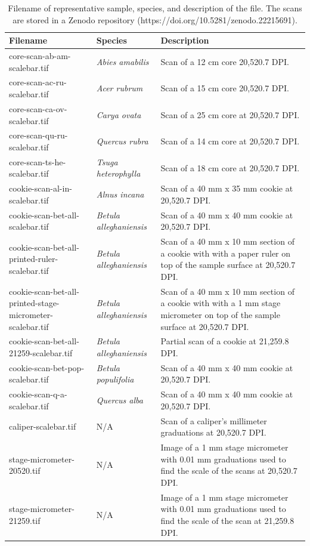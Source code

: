 \begin{table}[htbp]
    \centering
    \begin{tabular}{ |p{4.0cm}||p{4.0cm}|p{6.0cm}| }
        \hline
        \hline
        Filename & Species & Description \\
        \hline
        core-scan-ab-am-scalebar.tif & \textit{Abies amabilis} & Scan of a 12 cm core 20,520.7 DPI. \\
        core-scan-ac-ru-scalebar.tif & \textit{Acer rubrum} & Scan of a 15 cm core 20,520.7 DPI. \\
        core-scan-ca-ov-scalebar.tif & \textit{Carya ovata} & Scan of a 25 cm core at 20,520.7 DPI. \\
        core-scan-qu-ru-scalebar.tif & \textit{Quercus rubra} & Scan of a 14 cm core at 20,520.7 DPI. \\
        core-scan-ts-he-scalebar.tif & \textit{Tsuga heterophylla} & Scan of a 18 cm core at 20,520.7 DPI. \\
        cookie-scan-al-in-scalebar.tif & \textit{Alnus incana} & Scan of a 40 mm x 35 mm cookie at 20,520.7 DPI. \\
        cookie-scan-bet-all-scalebar.tif & \textit{Betula alleghaniensis} & Scan of a 40 mm x 40 mm cookie at 20,520.7 DPI. \\
        cookie-scan-bet-all-printed-ruler-scalebar.tif & \textit{Betula alleghaniensis} & Scan of a 40 mm x 10 mm section of a cookie with with a paper ruler on top of the sample surface at 20,520.7 DPI. \\
        cookie-scan-bet-all-printed-stage-micrometer-scalebar.tif & \textit{Betula alleghaniensis} & Scan of a 40 mm x 10 mm section of a cookie with with a 1 mm stage micrometer on top of the sample surface at 20,520.7 DPI. \\
        cookie-scan-bet-all-21259-scalebar.tif & \textit{Betula alleghaniensis} & Partial scan of a cookie at 21,259.8 DPI. \\
        cookie-scan-bet-pop-scalebar.tif & \textit{Betula populifolia} & Scan of a 40 mm x 40 mm cookie at 20,520.7 DPI. \\
        cookie-scan-q-a-scalebar.tif & \textit{Quercus alba} & Scan of a 40 mm x 40 mm cookie at 20,520.7 DPI. \\
        caliper-scalebar.tif & N/A & Scan of a caliper's millimeter graduations at 20,520.7 DPI. \\
        stage-micrometer-20520.tif & N/A & Image of a 1 mm stage micrometer with 0.01 mm graduations used to find the scale of the scans at 20,520.7 DPI. \\
        stage-micrometer-21259.tif & N/A & Image of a 1 mm stage micrometer with 0.01 mm graduations used to find the scale of the scan at 21,259.8 DPI. \\
        \hline
    \end{tabular}
    \caption{Filename of representative sample, species, and description of the file. The scans are stored in a Zenodo repository (https://doi.org/10.5281/zenodo.22215691).}
    \label{tab:scans}
\end{table}